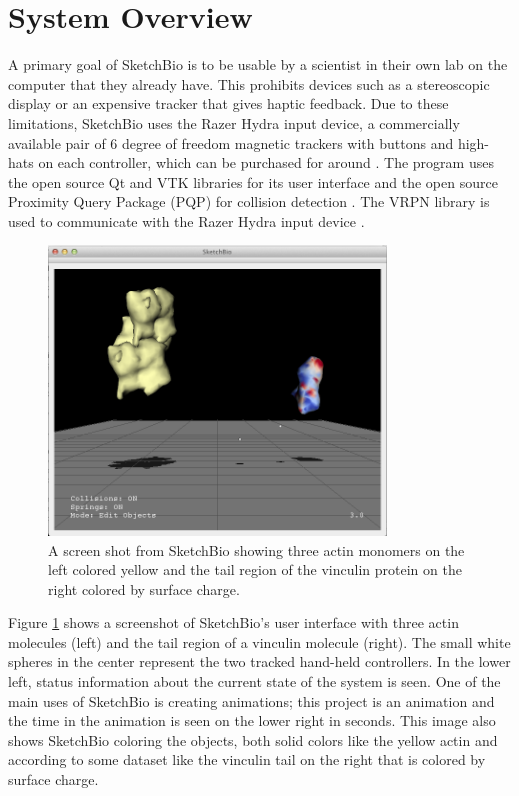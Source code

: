 \documentclass{article} %
\begin{document}
\section{System Overview}
A primary goal of SketchBio is to be usable by a scientist in their own lab on the computer that they already have.  This prohibits devices such as a stereoscopic display or an expensive tracker that gives haptic feedback.  Due to these limitations, SketchBio uses the Razer Hydra input device, a commercially available pair of 6 degree of freedom magnetic trackers with buttons and high-hats on each controller, which can be purchased for around .  The program uses the open source Qt and VTK\cite{VTKbook} libraries for its user interface and the open source Proximity Query Package (PQP) for collision detection \cite{PQP}.  The VRPN library is used to communicate with the Razer Hydra input device \cite{taylor2001vrpn}.

\begin{figure}[t]
\centering
\includegraphics[width=0.8\textwidth]{actinVinculin.png}
\caption{A screen shot from SketchBio showing three actin monomers on the left colored yellow and the tail region of the vinculin protein on the right colored by surface charge.}
\label{fig:actin_vinculin}
\end{figure}

Figure \ref{fig:actin_vinculin} shows a screenshot of SketchBio's user interface with three actin molecules (left) and the tail region of a vinculin molecule (right).  The small white spheres in the center represent the two tracked hand-held controllers.  In the lower left, status information about the current state of the system is seen.  One of the main uses of SketchBio is creating animations; this project is an animation and the time in the animation is seen on the lower right in seconds.  This image also shows SketchBio coloring the objects, both solid colors like the yellow actin and according to some dataset like the vinculin tail on the right that is colored by surface charge.
\end{document}
